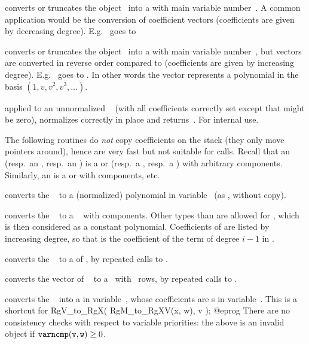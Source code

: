  converts or truncates the object~
into a  with main variable number~. A common application
would be the conversion of coefficient vectors (coefficients are given by
decreasing degree). E.g.~\kbd{[2,3]} goes to 

 converts or truncates the object~
into a  with main variable number~, but vectors are converted
in reverse order compared to  (coefficients are given by
increasing degree). E.g.~\kbd{[2,3]} goes to . In other words
the vector represents a polynomial in the basis $(1,v,v^2,v^3,\dots)$.

 applied to an unnormalized ~
(with all coefficients correctly set except that  might
be zero), normalizes  correctly in place and returns~. For
internal use.

The following routines do \emph{not} copy coefficients on the stack (they
only move pointers around), hence are very fast but not suitable for
 calls. Recall that an  (resp.~an , resp.~an
) is a  or  (resp.~a , resp.~a )
with arbitrary components. Similarly, an  is a  or
 with  components, etc.

 converts the ~ to a
(normalized) polynomial in variable~ (as , without
copy).

 converts the ~ to a
~ with  components. Other types than  are
allowed for , which is then considered as a constant polynomial.
Coefficients of  are listed by increasing degree, so that 
is the coefficient of the term of degree $i-1$ in .

 converts the ~ to a
 of , by repeated calls to .

 converts the vector of ~
to a~ with ~rows, by repeated calls to .

 converts the ~ into
a  in variable~, whose coefficients are s in
variable~. This is a shortcut for
\bprog
  RgV_to_RgX( RgM_to_RgXV(x, w), v );
@eprog\noindent
There are no consistency checks with respect to variable
priorities: the above is an invalid object if ${\tt varncmp(v, w)} \geq 0$.

